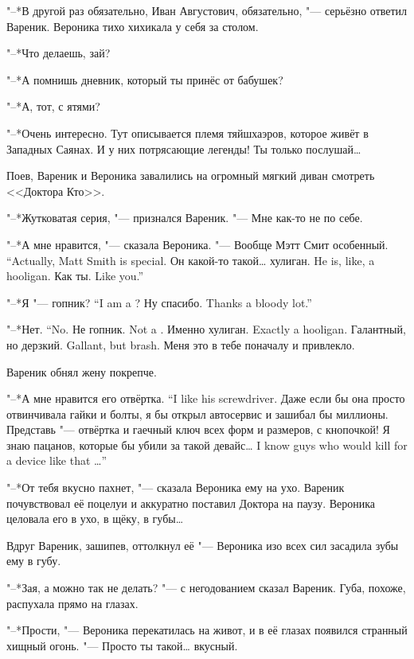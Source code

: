 "--*В другой раз обязательно, Иван Августович, обязательно, "--- серьёзно ответил Вареник.
Вероника тихо хихикала у себя за столом.

"--*Что делаешь, зай?

"--*А помнишь дневник, который ты принёс от бабушек?

"--*А, тот, с ятями?

"--*Очень интересно.
Тут описывается племя тяйшхаэров, которое живёт в Западных Саянах.
И у них потрясающие легенды!
Ты только послушай\ldots{}

Поев, Вареник и Вероника завалились на огромный мягкий диван смотреть <<Доктора Кто>>.

"--*Жутковатая серия, "--- признался Вареник.
"--- Мне как-то не по себе.

"--*А мне нравится, "--- сказала Вероника.
{"--- Вообще Мэтт Смит особенный.}
{``Actually, Matt Smith is special.}
{Он какой-то такой\ldots{} хулиган.}
{He is, like, a hooligan.}
{Как ты.}
{Like you.''}

{"--*Я "--- гопник?}
{``I am a \gopnik?}
{Ну спасибо.}
{Thanks a bloody lot.''}

{"--*Нет.}
{``No.}
{Не гопник.}
{Not a \gopnik.}
{Именно хулиган.}
{Exactly a hooligan.}
{Галантный, но дерзкий.}
{Gallant, but brash.}
Меня это в тебе поначалу и привлекло.

Вареник обнял жену покрепче.

{"--*А мне нравится его отвёртка.}
{``I like his screwdriver.}
Даже если бы она просто отвинчивала гайки и болты, я бы открыл автосервис и зашибал бы миллионы.
Представь "--- отвёртка и гаечный ключ всех форм и размеров, с кнопочкой!
{Я знаю пацанов, которые бы убили за такой девайс\ldots{}}
{I know guys who would kill for a device like that \ldots{}''}

"--*От тебя вкусно пахнет, "--- сказала Вероника ему на ухо.
Вареник почувствовал её поцелуи и аккуратно поставил Доктора на паузу.
Вероника целовала его в ухо, в щёку, в губы\ldots{}

Вдруг Вареник, зашипев, оттолкнул её "--- Вероника изо всех сил засадила зубы ему в губу.

"--*Зая, а можно так не делать? "--- с негодованием сказал Вареник.
Губа, похоже, распухала прямо на глазах.

"--*Прости, "--- Вероника перекатилась на живот, и в её глазах появился странный хищный огонь.
"--- Просто ты такой\ldots{} вкусный.

